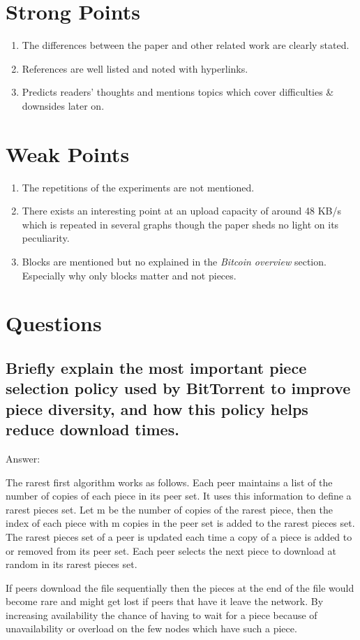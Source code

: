 \documentclass[conference]{IEEEtran}
\begin{document}
\section{Strong Points}

\begin{enumerate}
 \item The differences between the paper and other related work are clearly stated.
 \item References are well listed and noted with hyperlinks.
 \item Predicts readers' thoughts and mentions topics which cover difficulties \& downsides later on.
\end{enumerate}


\section{Weak Points}
\begin{enumerate}
\item The repetitions of the experiments are not mentioned.
\item There exists an interesting point at an upload capacity of around 48 KB/s which is repeated in several graphs though the paper sheds no light on its peculiarity.  
\item Blocks are mentioned but no explained in the \emph{Bitcoin overview} section. Especially why only blocks matter and not pieces.
\end{enumerate}



\section{Questions}

\subsection{Briefly explain the most important piece selection policy used by BitTorrent to improve piece diversity, and how this policy helps reduce download times.}

Answer:

The rarest first algorithm works as follows. Each peer maintains a list of the number of copies of each piece in its peer set. It uses this information to define a rarest pieces set. Let m be the number of copies of the rarest piece, then the index of each piece with m copies in the peer set is added to the rarest pieces set. The rarest pieces set of a peer is updated each time a copy of a piece is added to or removed from its peer set. Each peer selects the next piece to download at random in its rarest pieces set.

If peers download the file sequentially then the pieces at the end of the file would become rare and might get lost if peers that have it leave the network. By increasing availability the chance of having to wait for a piece because of unavailability or overload on the few nodes which have such a piece.





\end{document}
